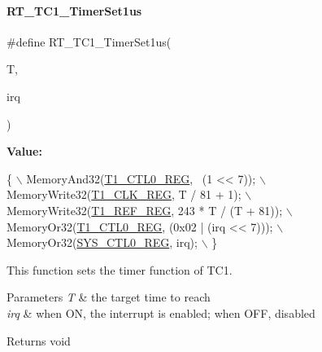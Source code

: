 \paragraph{\texorpdfstring{R\+T\+\_\+\+T\+C1\+\_\+\+Timer\+Set1us}{RT\_TC1\_TimerSet1us}}
{\footnotesize\ttfamily \#define R\+T\+\_\+\+T\+C1\+\_\+\+Timer\+Set1us(\begin{DoxyParamCaption}\item[{}]{T,  }\item[{}]{irq }\end{DoxyParamCaption})}

{\bfseries Value\+:}
\begin{DoxyCode}
\{                                                  \(\backslash\)
        MemoryAnd32(\mbox{\hyperlink{a00020_adadaa0ab1ebbd7ba9b70dfd24c3ed44da38632250c2e72df96fcaa3f8bd8ecc5e}{T1\_CTL0\_REG}}, ~(1 << 7));           \(\backslash\)
        MemoryWrite32(\mbox{\hyperlink{a00020_adadaa0ab1ebbd7ba9b70dfd24c3ed44dad4c8dc76a3496583d94443a52d7c5606}{T1\_CLK\_REG}}, T / 81 + 1);             \(\backslash\)
        MemoryWrite32(\mbox{\hyperlink{a00020_adadaa0ab1ebbd7ba9b70dfd24c3ed44dab7bb28fcf87a9c631bc17c016065c2da}{T1\_REF\_REG}}, 243 * T / (T + 81)); \(\backslash\)
        MemoryOr32(\mbox{\hyperlink{a00020_adadaa0ab1ebbd7ba9b70dfd24c3ed44da38632250c2e72df96fcaa3f8bd8ecc5e}{T1\_CTL0\_REG}}, (0x02 | (irq << 7)));  \(\backslash\)
        MemoryOr32(\mbox{\hyperlink{a00020_adadaa0ab1ebbd7ba9b70dfd24c3ed44dab61d9968d782d6c00e9de838e38913f5}{SYS\_CTL0\_REG}}, irq);                 \(\backslash\)
    \}
\end{DoxyCode}


This function sets the timer function of T\+C1. 


\begin{DoxyParams}{Parameters}
{\em T} & the target time to reach \\
\hline
{\em irq} & when ON, the interrupt is enabled; when O\+FF, disabled \\
\hline
\end{DoxyParams}
\begin{DoxyReturn}{Returns}
void 
\end{DoxyReturn}
